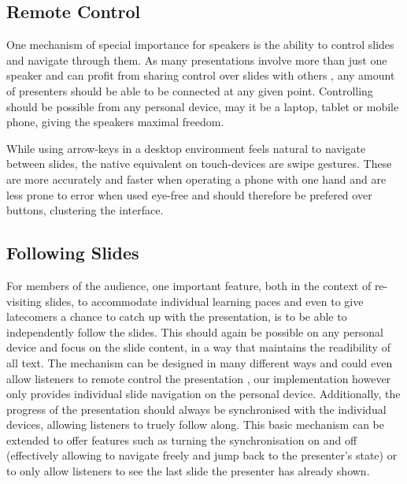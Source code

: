 %

\subsection{Remote Control}
One mechanism of special importance for speakers is the ability to control slides and navigate through them. As many presentations involve more than just one speaker and can profit from sharing control over slides with others \cite{Chattopadhyay:OfficeSocialRemoteControl}, any amount of presenters should be able to be connected at any given point. Controlling should be possible from any personal device, may it be a laptop, tablet or mobile phone, giving the speakers maximal freedom.

While using arrow-keys in a desktop environment feels natural to navigate between slides, the native equivalent on touch-devices are swipe gestures. These are more accurately and faster when operating a phone with one hand \cite{Lai:SingleHandedThumbInteraction} and are less prone to error when used eye-free \cite{Negulescu:TapSwipeMove} and should therefore be prefered over buttons, clustering the interface.

\subsection{Following Slides}
For members of the audience, one important feature, both in the context of re-visiting slides, to accommodate individual learning paces and even to give latecomers a chance to catch up with the presentation, is to be able to independently follow the slides. This should again be possible on any personal device and focus on the slide content, in a way that maintains the readibility of all text. The mechanism can be designed in many different ways and could even allow listeners to remote control the presentation \cite{Chattopadhyay:OfficeSocialRemoteControl}, our implementation however only provides individual slide navigation on the personal device. Additionally, the progress of the presentation should always be synchronised with the individual devices, allowing listeners to truely follow along. This basic mechanism can be extended to offer features such as turning the synchronisation on and off (effectively allowing to navigate freely and jump back to the presenter's state) or to only allow listeners to see the last slide the presenter has already shown.

